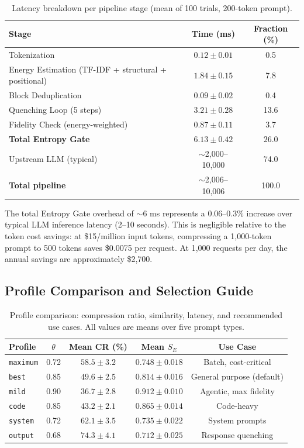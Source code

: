 \documentclass[11pt]{article}
\theoremstyle{remark}
\begin{document}
\begin{table}[H]
\centering
\caption{Latency breakdown per pipeline stage (mean of 100 trials, 200-token prompt).}
\label{tab:latency}
\begin{tabular}{lcc}
\toprule
Stage & Time (ms) & Fraction (\%) \\
\midrule
Tokenization & $0.12 \pm 0.01$ & 0.5 \\
Energy Estimation (TF-IDF + structural + positional) & $1.84 \pm 0.15$ & 7.8 \\
Block Deduplication & $0.09 \pm 0.02$ & 0.4 \\
Quenching Loop (5 steps) & $3.21 \pm 0.28$ & 13.6 \\
Fidelity Check (energy-weighted) & $0.87 \pm 0.11$ & 3.7 \\
\addlinespace
\textbf{Total Entropy Gate} & $\mathbf{6.13 \pm 0.42}$ & $\mathbf{26.0}$ \\
Upstream LLM (typical) & $\sim$2,000--10,000 & 74.0 \\
\textbf{Total pipeline} & $\sim$2,006--10,006 & 100.0 \\
\bottomrule
\end{tabular}
\end{table}

The total Entropy Gate overhead of $\sim$6 ms represents a 0.06--0.3\%
increase over typical LLM inference latency (2--10 seconds). This is
negligible relative to the token cost savings: at \$15/million input
tokens, compressing a 1,000-token prompt to 500 tokens saves
\$0.0075 per request. At 1,000 requests per day, the annual savings
are approximately \$2,700.

\subsection{Profile Comparison and Selection Guide}

\begin{table}[H]
\centering
\caption{Profile comparison: compression ratio, similarity, latency, and
recommended use cases. All values are means over five prompt types.}
\label{tab:profile-comparison}
\small
\begin{tabular}{lcccc}
\toprule
Profile & $\theta$ & Mean CR (\%) & Mean $S_E$ & Use Case \\
\midrule
\texttt{maximum}  & 0.72 & $58.5 \pm 3.2$ & $0.748 \pm 0.018$ & Batch, cost-critical \\
\texttt{best}     & 0.85 & $49.6 \pm 2.5$ & $0.814 \pm 0.016$ & General purpose (default) \\
\texttt{mild}     & 0.90 & $36.7 \pm 2.8$ & $0.912 \pm 0.010$ & Agentic, max fidelity \\
\texttt{code}     & 0.85 & $43.2 \pm 2.1$ & $0.865 \pm 0.014$ & Code-heavy \\
\texttt{system}   & 0.72 & $62.1 \pm 3.5$ & $0.735 \pm 0.022$ & System prompts \\
\texttt{output}   & 0.68 & $74.3 \pm 4.1$ & $0.712 \pm 0.025$ & Response quenching \\
\bottomrule
\end{tabular}
\end{table}
\end{document}
